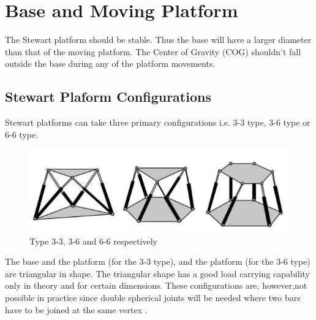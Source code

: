\section{Base and Moving Platform}
 The Stewart platform should be stable. Thus the base will have a larger diameter than that of the moving platform. The Center of Gravity (COG) shouldn't fall outside the base during any of the platform movements.
\subsection{Stewart Plaform Configurations}
Stewart platforms can take three primary configurations i.e. 3-3 type, 3-6 type or 6-6 type.
\begin{center}
	\begin{figure}[!h]
	\centering
	\includegraphics{Figures/stewart}
	\caption[Configurations]{Type 3-3, 3-6 and 6-6 respectively
	\cite{fernandes_design_nodate}}
	\end{figure}
\end{center}
The base and the platform (for the 3-3 type), and the platform (for the 3-6 type) are triangular in shape. The triangular shape has a good load carrying capability only in theory and for certain dimensions. These configurations are, however,not possible in practice since double spherical joints will be needed where two bars have to be joined at the same vertex
\cite{fernandes_design_nodate}.

